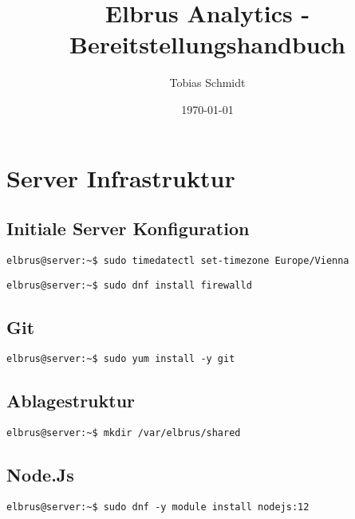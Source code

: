 \documentclass{article}
\begin{document}
	\title{Elbrus Analytics - Bereitstellungshandbuch}
	\author{Tobias Schmidt}
	\date{\today}
	\maketitle
	\newpage
	
	\section[Server Infrastruktur]{Server Infrastruktur}
	\subsection{Initiale Server Konfiguration}

	\begin{lstlisting}[caption={Setzen der Zeitzone auf 'Europa/Wien'.}]
		elbrus@server:~$ sudo timedatectl set-timezone Europe/Vienna
	\end{lstlisting}

	\begin{lstlisting}[caption={Installieren von dem 'firewalld' Service.}]
		elbrus@server:~$ sudo dnf install firewalld
	\end{lstlisting}

	\subsection{Git}
	\begin{lstlisting}[caption={Installieren von dem VCS 'git'.}]
		elbrus@server:~$ sudo yum install -y git
	\end{lstlisting}
	
	\subsection{Ablagestruktur}
	\lstset{style=commands}
	\begin{lstlisting}[caption={Anlegen der Verzeichnissstruktur.}]
		elbrus@server:~$ mkdir /var/elbrus/shared
	\end{lstlisting}

	\subsection{Node.Js}
	\begin{lstlisting}[caption={Installieren des Framworks 'Node.Js'.}]
		elbrus@server:~$ sudo dnf -y module install nodejs:12
	\end{lstlisting}
	
\end{document}
